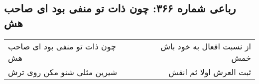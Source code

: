 \begin{center}
\section*{رباعی شماره ۳۶۶: چون ذات تو منفی بود ای صاحب هش}
\label{sec:sh366}
\begin{longtable}{l p{0.5cm} r}
چون ذات تو منفی بود ای صاحب هش
&&
از نسبت افعال به خود باش خمش
\\
شیرین مثلی شنو مکن روی ترش
&&
ثبت العرش اولا ثم انقش
\\
\end{longtable}
\end{center}
